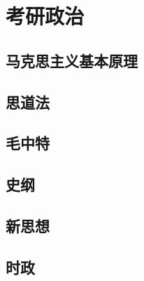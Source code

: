 \documentclass[12pt, a4paper, oneside, UTF8]{ctexbook}
\begin{document}
% 
\else
\fi
\chapter{考研政治}
\section{马克思主义基本原理}

\section{思道法} 

\section{毛中特} 

\section{史纲}

\section{新思想}

\section{时政}

\ifx\allfiles\undefined
\end{document}
